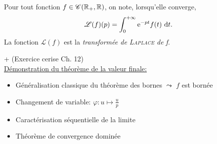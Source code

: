 \begin{tcolorbox}
    Pour tout fonction $f \in \mathscr{C}(\mathbb{R}_+, \mathbb{R})$, on note, lorsqu'elle converge, 
    $$\mathscr{L}(f)(p) = \int_{0}^{+ \infty} \mathrm{e}^{-pt} f(t)\ \mathrm{d} t.$$
    La fonction $\mathscr{L}(f)$ est la \emph{transformée de \textsc{Laplace} de f}.
\end{tcolorbox}

\cite{exos_oraux} + \cite{acamanes} (Exercice cerise Ch. 12) \\
\underline{Démonstration du théorème de la valeur finale:}
\begin{itemize}
    \item Généralisation classique du théorème des bornes $\leadsto$ $f$ est bornée
    \item Changement de variable: $\varphi: u \mapsto \frac{u}{p}$
    \item Caractérisation séquentielle de la limite
    \item Théorème de convergence dominée
\end{itemize}
